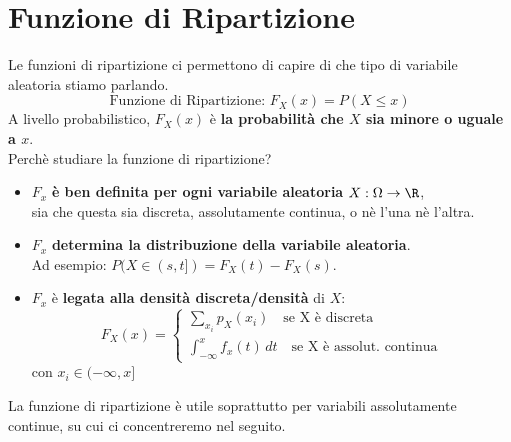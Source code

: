 	\pagebreak

	\section{Funzione di Ripartizione}
	Le funzioni di ripartizione ci permettono di capire di che tipo di variabile aleatoria
	stiamo parlando.
	\[
		\text{Funzione di Ripartizione: } F_X (x) = P(X \leq x)
	\]
	A livello probabilistico, $F_X(x)$ è \textbf{la probabilità che $X$ sia minore o uguale a $x$}.
	\\Perchè studiare la funzione di ripartizione?
	\begin{itemize}
		\item $F_x$ \textbf{è ben definita per ogni variabile aleatoria} $X: \Omega \rightarrow \R$,
		      \\sia che questa sia discreta, assolutamente continua, o nè l'una nè l'altra.
		\item $F_x$\textbf{ determina la distribuzione della variabile aleatoria}.
		      \\Ad esempio: $P(X\in(s,t]) = F_X(t) - F_X(s)$.
		\item $F_x$ è \textbf{legata alla densità discreta/densità} di $X$:
		      \[
			      F_X(x) =
			      \begin{cases}
				      \sum_{x_i} p_X (x_i) \quad \text{se X è discreta} \\
				      \int_{-\infty}^{x} f_x(t)\,dt \quad \text{se X è assolut. continua}
			      \end{cases}
		      \]
		      con $x_i \in (- \infty, x]$
	\end{itemize}
	La funzione di ripartizione è utile soprattutto per variabili assolutamente continue, su cui
	ci concentreremo nel seguito.

